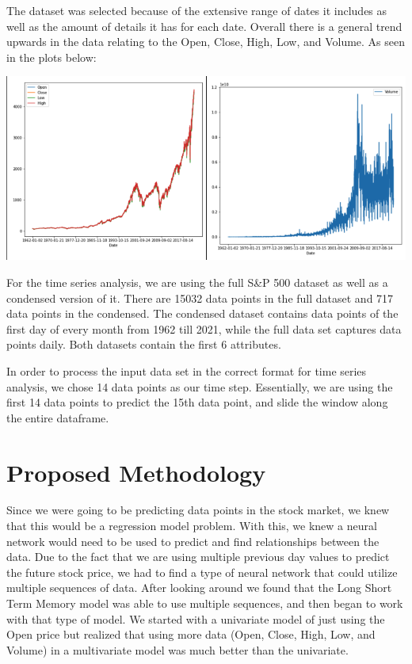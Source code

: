\documentclass{article}
\begin{document}
The dataset was selected because of the extensive range of dates it includes as well as the amount of details it has for each date. Overall there is a general trend upwards in the data relating to the Open, Close, High, Low, and Volume. As seen in the plots below:
\begin{center}
	\includegraphics[scale=0.4]{p1.png}
\end{center}

For the time series analysis, we are using the full S\&P 500 dataset as well as a condensed version of it. There are 15032 data points in the full dataset and 717 data points in the condensed. The condensed dataset contains data points of the first day of every month from 1962 till 2021, while the full data set captures data points daily. Both datasets contain the first 6 attributes. 

In order to process the input data set in the correct format for time series analysis, we chose 14 data points as our time step. Essentially, we are using the first 14 data points to predict the 15th data point, and slide the window along the entire dataframe. 


\section{Proposed Methodology} 

Since we were going to be predicting data points in the stock market, we knew that this would be a regression model problem. With this, we knew a neural network would need to be used to predict and find relationships between the data. Due to the fact that we are using multiple previous day values to predict the future stock price, we had to find a type of neural network that could utilize multiple sequences of data. After looking around we found that the Long Short Term Memory model was able to use multiple sequences, and then began to work with that type of model. We started with a univariate model of just using the Open price but realized that using more data (Open, Close, High, Low, and Volume) in a multivariate model was much better than the univariate.
\end{document}
